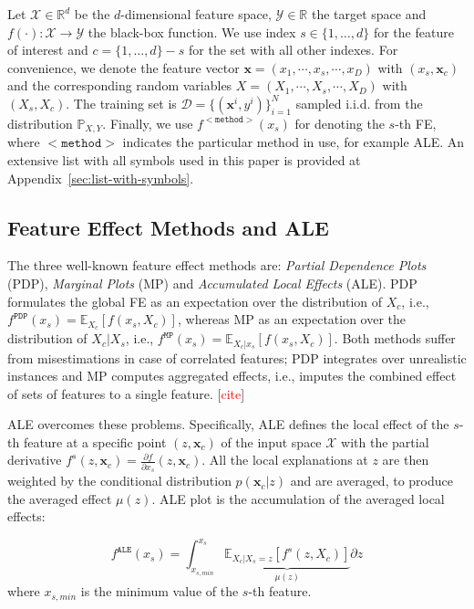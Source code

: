 \documentclass[twoside]{article}
\newcommand{\xc}{\mathbf{x}_c}
\newcommand{\xb}{\mathbf{x}}
\newcommand{\todo}[1]{[\textcolor{red}{#1}]}
\begin{document}
Let \(\mathcal{X} \in \mathbb{R}^d\) be the \(d\)-dimensional feature
space, \(\mathcal{Y} \in \mathbb{R}\) the target space and
\(f(\cdot) : \mathcal{X} \rightarrow \mathcal{Y}\) the black-box
function. We use index \(s \in \{1, \ldots, d\}\) for the feature of
interest and \(c = \{1, \ldots, d\} - s\) for the set with all other
indexes. For convenience, we denote the feature vector
\(\xb = (x_1, \cdots , x_s, \cdots, x_D)\) with \((x_s, \xc)\) and the
corresponding random variables
\(X = (X_1, \cdots , X_s, \cdots, X_D)\) with \((X_s, X_c)\). The
training set is \(\mathcal{D} = \{(\xb^i, y^i)\}_{i=1}^N\) sampled
i.i.d. from the distribution \(\mathbb{P}_{X,Y}\). Finally, we use
\(f^{\mathtt{<method>}}(x_s)\) for denoting the \(s\)-th FE, where
\(\mathtt{<method>}\) indicates the particular method in use, for
example ALE. An extensive list with all symbols used in this paper is
provided at Appendix~\ref{sec:list-with-symbols}.

\subsection{Feature Effect Methods and ALE}
\label{sec:feat-effect-meth}
The three well-known feature effect methods are: \emph{Partial
  Dependence Plots} (PDP), \emph{Marginal Plots} (MP) and
\emph{Accumulated Local Effects} (ALE).  PDP formulates the global FE
as an expectation over the distribution of \(X_c\), i.e.,
\(f^{\mathtt{PDP}}(x_s) = \mathbb{E}_{X_c}[f(x_s,X_c)]\), whereas MP
as an expectation over the distribution of \(X_c|X_s\), i.e.,
\(f^{\mathtt{MP}}(x_s) = \mathbb{E}_{X_c|x_s}[f(x_s, X_c)]\). Both
methods suffer from misestimations in case of correlated features; PDP
integrates over unrealistic instances and MP computes aggregated
effects, i.e., imputes the combined effect of sets of features to a
single feature. \todo{cite}

ALE overcomes these problems. Specifically, ALE defines the local
effect of the \(s\)-th feature at a specific point \((z, \xc)\) of the
input space \(\mathcal{X}\) with the partial derivative
\(f^s(z, \xc) = \frac{\partial f}{\partial x_s} (z, \xc)\). All the
local explanations at \(z\) are then weighted by the conditional
distribution \(p(\xc|z)\) and are averaged, to produce the averaged
effect \(\mu(z)\). ALE plot is the accumulation of the averaged local
effects:

\begin{equation}
  \label{eq:ALE}
  f^{\mathtt{ALE}}(x_s) = \int_{x_{s,min}}^{x_s} \underbrace{\mathbb{E}_{X_c|X_s=z}\left [f^s (z, X_c)\right ]}_{\mu(z)} \partial z
\end{equation}
%
where \(x_{s,min}\) is the minimum value of the \(s\)-th feature.
\end{document}
